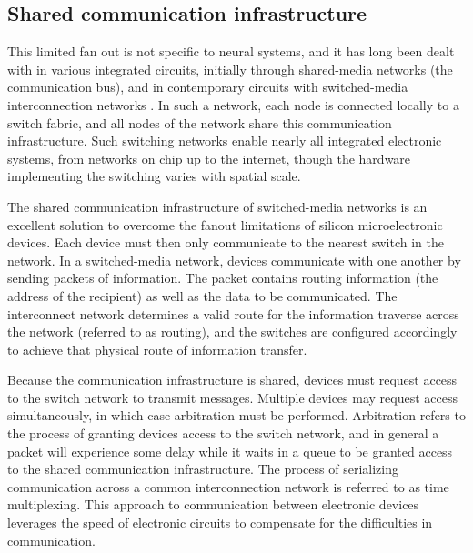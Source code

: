 \documentclass[twocolumn]{article}
\begin{document}
\subsection{Shared communication infrastructure}
This limited fan out is not specific to neural systems, and it has long been dealt with in various integrated circuits, initially through shared-media networks (the communication bus), and in contemporary circuits with switched-media interconnection networks \cite{hepa2012}. In such a network, each node is connected locally to a switch fabric, and all nodes of the network share this communication infrastructure. Such switching networks enable nearly all integrated electronic systems, from networks on chip up to the internet, though the hardware implementing the switching varies with spatial scale. 

The shared communication infrastructure of switched-media networks is an excellent solution to overcome the fanout limitations of silicon microelectronic devices. Each device must then only communicate to the nearest switch in the network. In a switched-media network, devices communicate with one another by sending packets of information. The packet contains routing information (the address of the recipient) as well as the data to be communicated. The interconnect network determines a valid route for the information traverse across the network (referred to as routing), and the switches are configured accordingly to achieve that physical route of information transfer.

Because the communication infrastructure is shared, devices must request access to the switch network to transmit messages. Multiple devices may request access simultaneously, in which case arbitration must be performed. Arbitration refers to the process of granting devices access to the switch network, and in general a packet will experience some delay while it waits in a queue to be granted access to the shared communication infrastructure. The process of serializing communication across a common interconnection network is referred to as time multiplexing. This approach to communication between electronic devices leverages the speed of electronic circuits to compensate for the difficulties in communication. 
\end{document}
